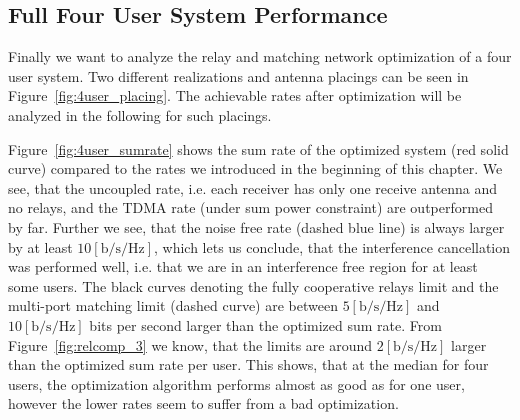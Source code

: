 \subsection{Full Four User System Performance}
\label{sec:4user_const}

Finally we want to analyze the relay and matching network optimization of a four user system.
Two different realizations and antenna placings can be seen in Figure~\ref{fig:4user_placing}.
The achievable rates after optimization will be analyzed in the following for such placings.


Figure~\ref{fig:4user_sumrate} shows the sum rate of the optimized system (red solid curve) compared to the rates we introduced in the beginning of this chapter.
We see, that the uncoupled rate, i.e. each receiver has only one receive antenna and no relays, and the TDMA rate (under sum power constraint) are outperformed by far.
Further we see, that the noise free rate (dashed blue line) is always larger by  at least  $10 \left[\text{b/s/Hz}\right]$, which lets us conclude, that the interference cancellation was performed well, i.e. that we are in an interference free region for at least some users.
The black curves denoting the fully cooperative relays limit and the multi-port matching limit (dashed curve) are between $5 \left[\text{b/s/Hz}\right]$ and $10 \left[\text{b/s/Hz}\right]$ bits per second larger than the optimized sum rate.
From Figure~\ref{fig:relcomp_3} we know, that the limits are around $2 \left[\text{b/s/Hz}\right]$ larger than the optimized sum rate per user.
This shows, that at the median for four users, the optimization algorithm performs almost as good as for one user, however the lower rates seem to suffer from a bad optimization.

